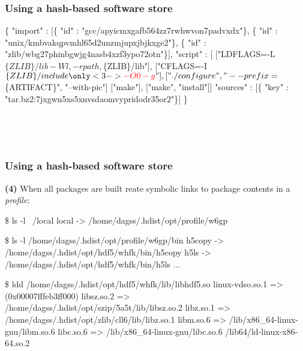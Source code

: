 \documentclass[sans,mathserif]{beamer}
\begin{document}
\begin{frame}[fragile]
  \frametitle{Using a hash-based software store}
{\footnotesize
\begin{semiverbatim}
\{ "import" : [\{ "id" : "gcc/apyicmxgafb564zz7rwhwvon7padvxdx"\},
               \{ "id" : "unix/kmbvakqpvmhl65d2unzmjupxjbjkxge2"\},
               \{ "id" : "zlib/wbg27phinbgwjg4nasb4xzf3ypo72otn"\}],
   "script" : [
        ["LDFLAGS=-L$\{ZLIB\}/lib -Wl,-rpath,$\{ZLIB\}/lib"],
        ["CFLAGS=-I$\{ZLIB\}/include \only<3->{{\color{red}-O0 -g}}"],
        ["./configure", "--prefix=$\{ARTIFACT\}", "--with-pic"]
        ["make"],
        ["make", "install"]]
   "sources" : [\{ "key" : "tar.bz2:7jxgwn5xs5xnvsdaomvypridodr35or2"\}]
\}
\end{semiverbatim}
}

~


~


\end{frame}

\begin{frame}[fragile]
  \frametitle{Using a hash-based software store}
{\bf (4)} When all packages are built reate symbolic links to
  package contents in a {\em profile}:
{
\footnotesize

\begin{semiverbatim}
\$ ls -l ~/local
local -> /home/dagss/.hdist/opt/profile/w6gp

\$ ls -l /home/dagss/.hdist/opt/profile/w6gp/bin
h5copy -> /home/dagss/.hdist/opt/hdf5/whfk/bin/h5copy
h5ls -> /home/dagss/.hdist/opt/hdf5/whfk/bin/h5ls
...

\$ ldd /home/dagss/.hdist/opt/hdf5/whfk/lib/libhdf5.so
linux-vdso.so.1 => (0x00007fffeb3ff000)
libsz.so.2 => {\color{red}/home/dagss/.hdist/opt/szip/5a5t/lib/libsz.so.2}
libz.so.1 => {\color{red}/home/dagss/.hdist/opt/zlib/cll6/lib/libz.so.1}
libm.so.6 => /lib/x86\_64-linux-gnu/libm.so.6
libc.so.6 => /lib/x86\_64-linux-gnu/libc.so.6
/lib64/ld-linux-x86-64.so.2
\end{semiverbatim}
}
  
\end{frame}
\end{document}
